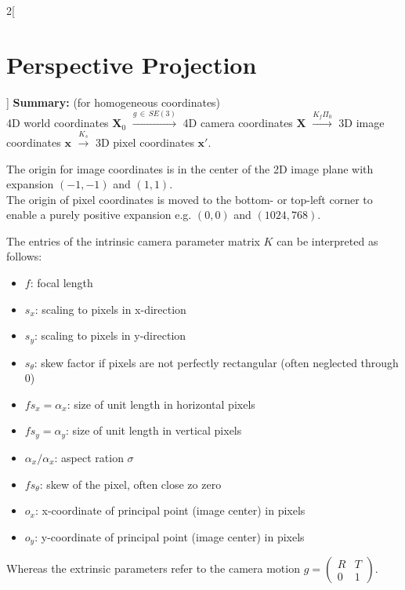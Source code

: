 \documentclass[oneside,fontsize=11pt,paper=a4]{scrartcl}
\begin{document}
\begin{multicols}{2}[\section{Perspective Projection}]
\textbf{Summary:} (for homogeneous coordinates)\\
4D world coordinates $\boldsymbol{X}_0$ $\xrightarrow{g \, \in \, SE(3)}$ 4D camera coordinates $\boldsymbol{X}$ $\xrightarrow{K_f \Pi_0}$ 3D image coordinates $\boldsymbol{x}$ $\xrightarrow{K_s}$ 3D pixel coordinates $\boldsymbol{x'}$.\par
\vspace{4mm}

The origin for image coordinates is in the center of the 2D image plane with expansion $(-1, -1)$ and $(1, 1)$.\\
The origin of pixel coordinates is moved to the bottom- or top-left corner to enable a purely positive expansion e.g. $(0, 0)$ and $(1024, 768)$.\par
\vspace{4mm}
	
The entries of the intrinsic camera parameter matrix $K$ can be interpreted as follows:
\begin{itemize}
    \item $f$: focal length
    \item $s_x$: scaling to pixels in x-direction
    \item $s_y$: scaling to pixels in y-direction
    \item $s_{\theta}$: skew factor if pixels are not perfectly rectangular (often neglected through $0$)
    \item $fs_x = \alpha_x$: size of unit length in horizontal pixels
    \item $fs_y = \alpha_y$: size of unit length in vertical pixels
    \item $\alpha_x / \alpha_x$: aspect ration $\sigma$
    \item $fs_{\theta}$: skew of the pixel, often close zo zero
    \item $o_x$: x-coordinate of principal point (image center) in pixels
    \item $o_y$: y-coordinate of principal point (image center) in pixels
\end{itemize}
Whereas the extrinsic parameters refer to the camera motion $g = \begin{pmatrix}R & T\\0 & 1 \end{pmatrix}$.


\end{multicols}
\end{document}
